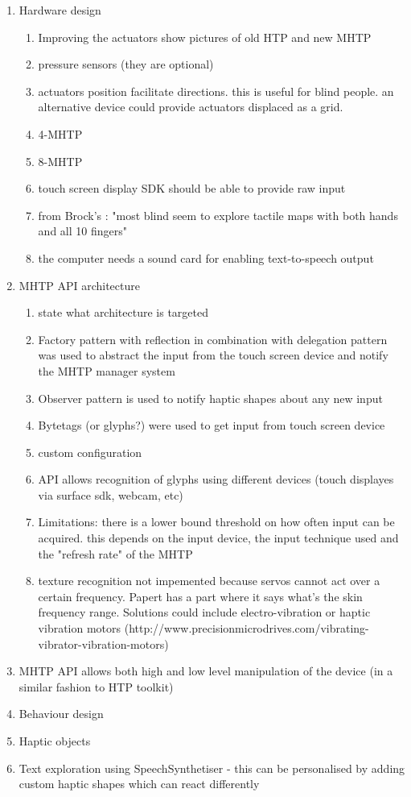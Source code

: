 \begin{enumerate}
	\item Hardware design
    	\begin{enumerate}
        	\item Improving the actuators
            	show pictures of old HTP and new MHTP
            \item pressure sensors (they are optional)
            \item actuators position facilitate directions. this is useful for blind people. an alternative device could provide actuators displaced as a grid.
            \item 4-MHTP
            \item 8-MHTP
            \item touch screen display SDK should be able to provide raw input
            \item from Brock's : "most blind seem to explore tactile maps with both hands and all 10 fingers"
            \item the computer needs a sound card for enabling text-to-speech output
        \end{enumerate}
	\item MHTP API architecture
    	\begin{enumerate}
        	\item state what architecture is targeted
        	\item Factory pattern with reflection in combination with delegation pattern was used to abstract the input from the touch screen device and notify the MHTP manager system
            \item Observer pattern is used to notify haptic shapes about any new input
            \item Bytetags (or glyphs?) were used to get input from touch screen device
            \item custom configuration
            \item API allows recognition of glyphs using different devices (touch displayes via surface sdk, webcam, etc)
            \item Limitations: there is a lower bound threshold on how often input can be acquired. this depends on the input device, the input technique used and the "refresh rate" of the MHTP
            \item texture recognition not impemented because servos cannot act over a certain frequency. Papert \cite{brown2005first} has a part where it says what's the skin frequency range. Solutions could include electro-vibration or haptic vibration motors (http://www.precisionmicrodrives.com/vibrating-vibrator-vibration-motors)
        \end{enumerate}
    \item MHTP API allows both high and low level manipulation of the device (in a similar fashion to HTP toolkit)
    \item Behaviour design
    \item Haptic objects
    \item Text exploration using SpeechSynthetiser - this can be personalised by adding custom haptic shapes which can react differently
\end{enumerate}


